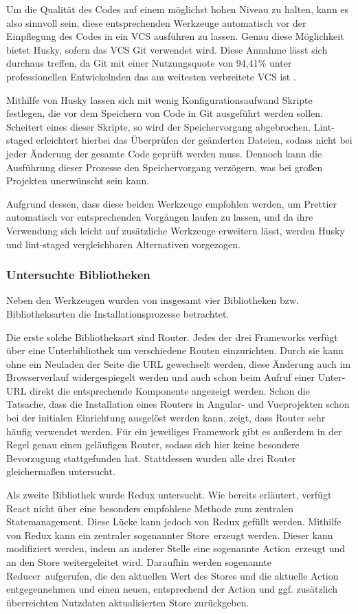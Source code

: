 Um die Qualität des Codes auf einem möglichst hohen Niveau zu halten, kann es also sinnvoll sein, diese entsprechenden Werkzeuge automatisch vor der Einpflegung des Codes in ein \gls{VCS} ausführen zu lassen. Genau diese Möglichkeit bietet Husky, sofern das \gls{VCS} Git verwendet wird. Diese Annahme lässt sich durchaus treffen, da Git mit einer Nutzungsquote von 94,41\% unter professionellen Entwickelnden das am weitesten verbreitete \gls{VCS} ist \cite{git_usage}.

Mithilfe von Husky lassen sich mit wenig Konfigurationsaufwand Skripte festlegen, die vor dem Speichern von Code in Git ausgeführt werden sollen. Scheitert eines dieser Skripte, so wird der Speichervorgang abgebrochen. Lint-staged erleichtert hierbei das Überprüfen der geänderten Dateien, sodass nicht bei jeder Änderung der gesamte Code geprüft werden muss. Dennoch kann die Ausführung dieser Prozesse den Speichervorgang verzögern, was bei großen Projekten unerwünscht sein kann.

Aufgrund dessen, dass diese beiden Werkzeuge empfohlen werden, um Prettier automatisch vor entsprechenden Vorgängen laufen zu lassen, und da ihre Verwendung sich leicht auf zusätzliche Werkzeuge erweitern lässt, werden Husky und lint-staged vergleichbaren Alternativen vorgezogen.

\subsubsection{Untersuchte Bibliotheken}
Neben den Werkzeugen wurden von insgesamt vier Bibliotheken bzw. Bibliotheksarten die Installationsprozesse betrachtet.

Die erste solche Bibliotheksart sind Router. Jedes der drei Frameworks verfügt über eine Unterbibliothek um verschiedene Routen einzurichten. Durch sie kann ohne ein Neuladen der Seite die URL gewechselt werden, diese Änderung auch im Browserverlauf widergespiegelt werden und auch schon beim Aufruf einer Unter-URL direkt die entsprechende Komponente angezeigt werden. Schon die Tatsache, dass die Installation eines Routers in Angular- und Vueprojekten schon bei der initialen Einrichtung ausgelöst werden kann, zeigt, dass Router sehr häufig verwendet werden. Für ein jeweiliges Framework gibt es außerdem in der Regel genau einen geläufigen Router, sodass sich hier keine besondere Bevorzugung stattgefunden hat. Stattdessen wurden alle drei Router gleichermaßen untersucht.

Als zweite Bibliothek wurde Redux untersucht. Wie bereits erläutert, verfügt React nicht über eine besonders empfohlene Methode zum zentralen Statemanagement. Diese Lücke kann jedoch von Redux gefüllt werden. Mithilfe von Redux kann ein zentraler sogenannter \glqq Store\grqq\ erzeugt werden. Dieser kann modifiziert werden, indem an anderer Stelle eine sogenannte \glqq Action\grqq\ erzeugt und an den Store weitergeleitet wird. Daraufhin werden sogenannte \glqq Reducer\grqq\ aufgerufen, die den aktuellen Wert des Stores und die aktuelle Action entgegennehmen und einen neuen, entsprechend der Action und ggf. zusätzlich überreichten Nutzdaten aktualisierten Store zurückgeben.

